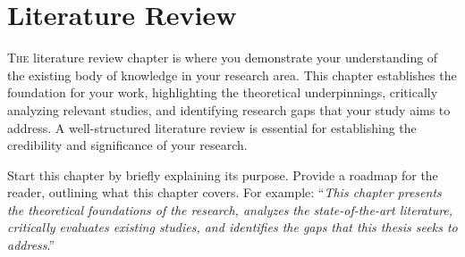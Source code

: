 %
%
%
%
%
%

\chapter{Literature Review}\label{chap:review}
\lettrine[lines=3]{T}{he} literature review chapter is where you demonstrate your understanding of the existing body of knowledge in your research area. This chapter establishes the foundation for your work, highlighting the theoretical underpinnings, critically analyzing relevant studies, and identifying research gaps that your study aims to address. A well-structured literature review is essential for establishing the credibility and significance of your research.

Start this chapter by briefly explaining its purpose. Provide a roadmap for the reader, outlining what this chapter covers. For example: ``\textit{This chapter presents the theoretical foundations of the research, analyzes the state-of-the-art literature, critically evaluates existing studies, and identifies the gaps that this thesis seeks to address}.''

